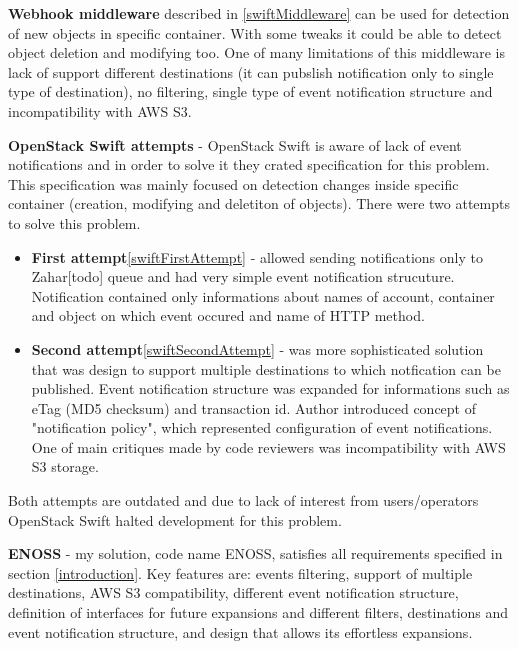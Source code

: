 \documentclass{ExcelAtFIT}
\begin{document}
\textbf{Webhook middleware} described in \ref{swiftMiddleware} can be used for detection of new objects in specific container. With some tweaks it could be able to detect object deletion and modifying too. One of many limitations of this middleware is lack of support different destinations (it can pubslish notification only to single type of destination), no filtering, single type of event notification structure and incompatibility with AWS S3.

\textbf{OpenStack Swift attempts} - OpenStack Swift is aware of lack of event notifications and in order to solve it they crated specification for this problem\cite{swiftProblem}. This specification was mainly focused on detection changes inside specific container (creation, modifying and deletiton of objects). There were two attempts to solve this problem.
\begin{itemize}
	\item \textbf{First attempt}\ref{swiftFirstAttempt} - allowed sending notifications only to Zahar[todo] queue and had very simple event notification strucuture. Notification contained only informations about names of account, container and object on which event occured and name of HTTP method.
	\item \textbf{Second attempt}\ref{swiftSecondAttempt} - was more sophisticated solution that was design to support multiple destinations to which notfication can be published. Event notification structure was expanded for informations such as eTag (MD5 checksum) and transaction id. Author introduced concept of "notification policy", which represented configuration of event notifications. One of main critiques made by code reviewers was incompatibility with AWS S3 storage.
\end{itemize}

Both attempts are outdated and due to lack of interest from users/operators OpenStack Swift halted development for this problem.


\textbf{ENOSS} - my solution, code name ENOSS, satisfies all requirements specified in section \ref{introduction}. Key features are: events filtering, support of multiple destinations, AWS S3 compatibility, different event notification structure, definition of interfaces for future expansions and different filters, destinations and event notification structure, and design that allows its effortless expansions. %
\end{document}
